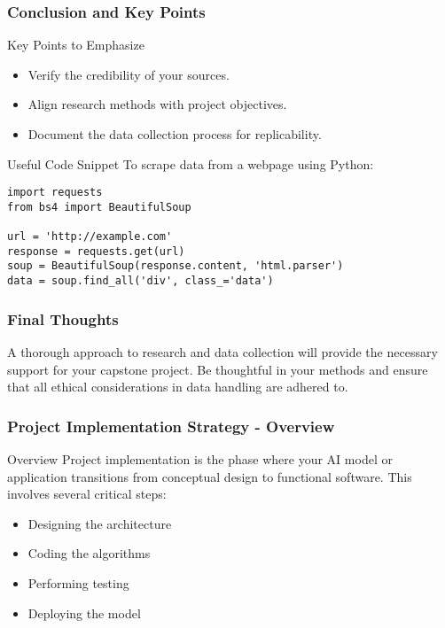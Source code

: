 \documentclass[aspectratio=169]{beamer}
\begin{document}
\begin{frame}[fragile]
    \frametitle{Conclusion and Key Points}
    \begin{block}{Key Points to Emphasize}
        \begin{itemize}
            \item Verify the credibility of your sources.
            \item Align research methods with project objectives.
            \item Document the data collection process for replicability.
        \end{itemize}
    \end{block}

    \begin{block}{Useful Code Snippet}
        To scrape data from a webpage using Python:
        \begin{lstlisting}
import requests
from bs4 import BeautifulSoup

url = 'http://example.com'
response = requests.get(url)
soup = BeautifulSoup(response.content, 'html.parser')
data = soup.find_all('div', class_='data')
        \end{lstlisting}
    \end{block}
\end{frame}

\begin{frame}
    \frametitle{Final Thoughts}
    A thorough approach to research and data collection will provide the necessary support for your capstone project. 
    Be thoughtful in your methods and ensure that all ethical considerations in data handling are adhered to.
\end{frame}

\begin{frame}[fragile]
    \frametitle{Project Implementation Strategy - Overview}
    \begin{block}{Overview}
        Project implementation is the phase where your AI model or application transitions from conceptual design to functional software. This involves several critical steps:
    \end{block}
    \begin{itemize}
        \item Designing the architecture
        \item Coding the algorithms
        \item Performing testing
        \item Deploying the model
    \end{itemize}
\end{frame}
\end{document}
